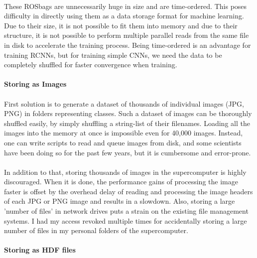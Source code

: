 \paragraph{}
These ROSbags are unnecessarily huge in size and are time-ordered. This poses difficulty in directly using them as a data storage format for machine learning. Due to their size, it is not possible to fit them into memory and due to their structure, it is not possible to perform multiple parallel reads from the same file in disk to accelerate the training process. Being time-ordered is an advantage for training RCNNs, but for training simple CNNs, we need the data to be completely shuffled for faster convergence when training.

\paragraph{}
\textbf{Storing as Images}

\paragraph{}
First solution is to generate a dataset of thousands of individual images (JPG, PNG) in folders representing classes. Such a dataset of images can be thoroughly shuffled easily, by simply shuffling a string-list of their filenames. Loading all the images into the memory at once is impossible even for 40,000 images. Instead, one can write scripts to read and queue images from disk, and some scientists have been doing so for the past few years, but it is cumbersome and error-prone. 

\paragraph{}
In addition to that, storing thousands of images in the supercomputer is highly discouraged. When it is done, the performance gains of processing the image faster is offset by the overhead delay of reading and processing the image headers of each JPG or PNG image and results in a slowdown. Also, storing a large 'number of files' in network drives puts a strain on the existing file management systems. I had my access revoked multiple times for accidentally storing a large number of files in my personal folders of the supercomputer.

\paragraph{}
\textbf{Storing as HDF files}

